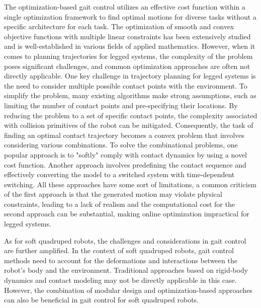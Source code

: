 The optimization-based gait control utilizes an effective cost function within a single optimization framework to find optimal motions for diverse tasks without a specific architecture for each task. The optimization of smooth and convex objective functions with multiple linear constraints has been extensively studied and is well-established in various fields of applied mathematics\cite{kolda2003Optimization}. However, when it comes to planning trajectories for legged systems, the complexity of the problem poses significant challenges, and common optimization approaches are often not directly applicable. One key challenge in trajectory planning for legged systems is the need to consider multiple possible contact points with the environment. To simplify the problem, many existing algorithms make strong assumptions, such as limiting the number of contact points\cite{dai2014Wholebody} and pre-specifying their locations\cite{gehring2016Practice}. By reducing the problem to a set of specific contact points, the complexity associated with collision primitives of the robot can be mitigated. Consequently, the task of finding an optimal contact trajectory becomes a convex problem that involves considering various combinations. To solve the combinational problems, one popular approach is to "softly" comply with contact dynamics by using a novel cost function\cite{farshidian2017Realtime}. Another approach involves predefining the contact sequence and effectively converting the model to a switched system with time-dependent switching\cite{koch2012Optimizationbased}. All these approaches have some sort of limitations, a common criticism of the first approach is that the generated motion may violate physical constraints, leading to a lack of realism and the computational cost for the second approach can be substantial, making online optimization impractical for legged systems. 

As for soft quadruped robots, the challenges and considerations in gait control are further amplified. In the context of soft quadruped robots, gait control methods need to account for the deformations and interactions between the robot's body and the environment. Traditional approaches based on rigid-body dynamics and contact modeling may not be directly applicable in this case. However, the combination of modular design and optimization-based approaches can also be beneficial in gait control for soft quadruped robots. 

